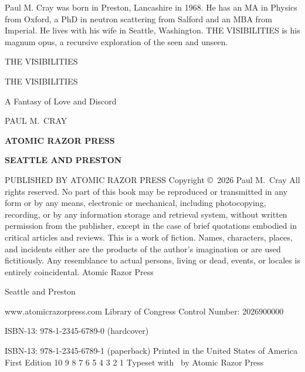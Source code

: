 

\startcentered
\frontmattergap
Paul M. Cray was born in Preston, Lancashire in 1968.
He has an MA in Physics from Oxford,
a PhD in neutron scattering from Salford and an MBA from Imperial.
He lives with his wife in Seattle, Washington.
{\twelvesl THE VISIBILITIES} is his magnum opus, a recursive exploration of the seen and unseen.
\stopcentered 

\blankpage %

\startcentered
\frontmattergap
{\serifbold THE VISIBILITIES}
\stopcentered 

\startcentered
\frontmattergap
\centerline{\hbox{}}
\stopcentered

\startcentered
\frontmattergap
{\serifboldhuge THE VISIBILITIES\par}
\vskip 4mm
{\serifboldlarge A Fantasy of Love and Discord\par}
\titlegap
{\serifboldlarge PAUL M.~CRAY\par}
\vfill
\centerline{\hbox{}}
\vskip 10mm
{\bf ATOMIC RAZOR PRESS\par}
{\bf SEATTLE AND PRESTON\par}
\stopcentered

\startcentered
\twelverm
PUBLISHED BY ATOMIC RAZOR PRESS
\copyrightgap
Copyright \copyright\ 2026 Paul M.~Cray
\copyrightgap
All rights reserved. No part of this book may be reproduced or transmitted in
any form or by any means, electronic or mechanical, including photocopying,
recording, or by any information storage and retrieval system, without written
permission from the publisher, except in the case of brief quotations embodied
in critical articles and reviews.
\copyrightgap
This is a work of fiction. Names, characters, places, and incidents either are
the products of the author's imagination or are used fictitiously. Any
resemblance to actual persons, living or dead, events, or locales is entirely
coincidental.
\copyrightgap
Atomic Razor Press\par
Seattle and Preston\par
www.atomicrazorpress.com
\copyrightgap
Library of Congress Control Number: 2026900000\par
ISBN-13: 978-1-2345-6789-0 (hardcover)\par
ISBN-13: 978-1-2345-6789-1 (paperback)
\copyrightgap
Printed in the United States of America
\copyrightgap
First Edition
10 9 8 7 6 5 4 3 2 1
\copyrightgap
Typeset with \OpTeX\ by Atomic Razor Press
\stopcentered
